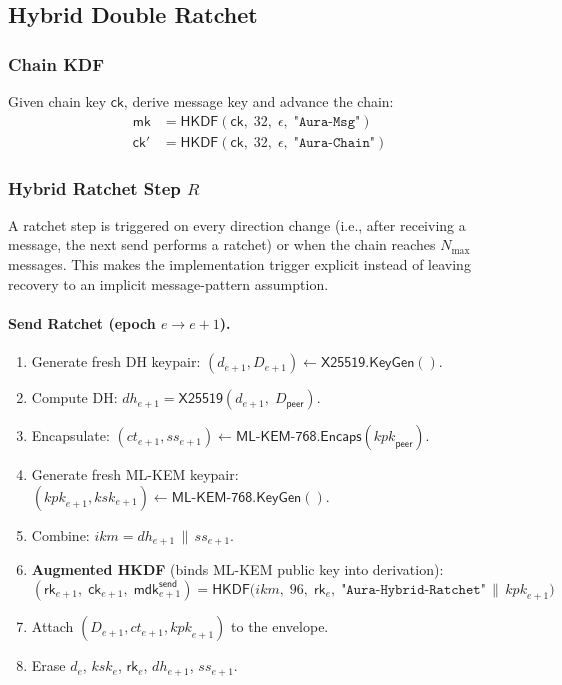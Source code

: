 \documentclass[11pt,a4paper]{article}
\theoremstyle{definition}
\theoremstyle{remark}
\newcommand{\HKDF}{\mathsf{HKDF}}
\renewcommand{\DH}{\mathsf{X25519}}
\newcommand{\KEM}{\mathsf{ML\text{-}KEM\text{-}768}}
\newcommand{\KeyGen}{\mathsf{KeyGen}}
\newcommand{\Encaps}{\mathsf{Encaps}}
\newcommand{\rk}{\mathsf{rk}}
\newcommand{\ck}{\mathsf{ck}}
\newcommand{\mk}{\mathsf{mk}}
\newcommand{\mdk}{\mathsf{mdk}}
\newcommand{\concat}{\,\|\,}
\begin{document}
\subsection{Hybrid Double Ratchet}
\label{subsec:ratchet}

\subsubsection{Chain KDF}

Given chain key $\ck$, derive message key and advance the chain:
\begin{align*}
  \mk &= \HKDF(\ck,\; 32,\; \epsilon,\; \texttt{"Aura-Msg"}) \\
  \ck' &= \HKDF(\ck,\; 32,\; \epsilon,\; \texttt{"Aura-Chain"})
\end{align*}

\subsubsection{\texorpdfstring{Hybrid Ratchet Step $R$}{Hybrid Ratchet Step R}}
\label{subsubsec:ratchet-step}

A ratchet step is triggered on every direction change (i.e., after receiving a
message, the next send performs a ratchet) or when the chain reaches
$N_{\max}$ messages.  This makes the implementation trigger explicit instead
of leaving recovery to an implicit message-pattern assumption.

\paragraph{Send Ratchet (epoch $e \to e{+}1$).}
\begin{enumerate}[nosep]
  \item Generate fresh DH keypair: $(d_{e+1}, D_{e+1}) \gets \DH.\KeyGen()$.
  \item Compute DH: $\mathit{dh}_{e+1} = \DH(d_{e+1},\; D_{\mathsf{peer}})$.
  \item Encapsulate: $(\mathit{ct}_{e+1}, \mathit{ss}_{e+1}) \gets \KEM.\Encaps(\mathit{kpk}_{\mathsf{peer}})$.
  \item Generate fresh ML-KEM keypair: $(\mathit{kpk}_{e+1}, \mathit{ksk}_{e+1}) \gets \KEM.\KeyGen()$.
  \item Combine: $\mathit{ikm} = \mathit{dh}_{e+1} \concat \mathit{ss}_{e+1}$.
  \item \textbf{Augmented HKDF} (binds ML-KEM public key into derivation):
  \[
    (\rk_{e+1},\; \ck_{e+1},\; \mdk_{e+1}^{\mathsf{send}}) =
    \HKDF\bigl(\mathit{ikm},\; 96,\;
      \rk_e,\;
      \texttt{"Aura-Hybrid-Ratchet"} \concat \mathit{kpk}_{e+1}\bigr)
  \]
  \item Attach $(D_{e+1}, \mathit{ct}_{e+1}, \mathit{kpk}_{e+1})$ to the envelope.
  \item Erase $d_e$, $\mathit{ksk}_e$, $\rk_e$, $\mathit{dh}_{e+1}$, $\mathit{ss}_{e+1}$.
\end{enumerate}
\end{document}
